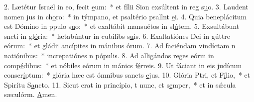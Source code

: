 2. Lætétur Israël in eo,  fecit \uline{e}um:~* et fílii Sion exsúltent in reg s\uline{u}o.
3. Laudent nomen jus in ch\uline{o}ro:~* in týmpano, et psaltério psallnt \uline{e}i.
4. Quia beneplácitum est Dómino in ppulo s\uline{u}o:~* et exaltábit mansuétos in sl\uline{ú}tem.
5. Exsultábunt sncti in gl\uline{ó}ria:~* lætabúntur in cubílibs s\uline{u}is.
6. Exaltatiónes Dei in gúttre e\uline{ó}rum:~* et gládii ancípites in mánibus \uline{ó}rum.
7. Ad faciéndam vindíctam n nati\uline{ó}nibus:~* increpatiónes n p\uline{ó}pulis.
8. Ad alligándos reges eórm in comp\uline{é}dibus:~* et nóbiles eórum in mánics f\uline{é}rreis.
9. Ut fáciant in eis judícum conscr\uline{í}ptum:~* glória hæc est ómnibus sancts \uline{e}jus.
10. Glória Ptri, et F\uline{í}lio,~* et Spirítu S\uline{a}ncto.
11. Sicut erat in princípio, t nunc, et s\uline{e}mper,~* et in sǽcula sæculórm. \uline{A}men.
